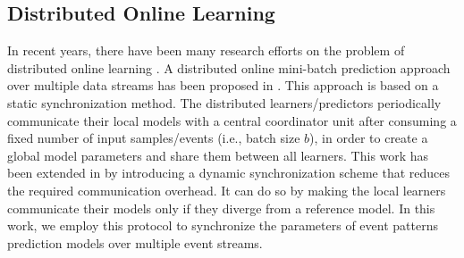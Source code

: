 
\subsection{Distributed Online Learning}
\par In recent years, there have been many research efforts on the problem of distributed online learning \cite{langford2009slow,yan2013distributed,xiao2010dual,dekel2012optimal,kamp2014communication}.  A distributed online mini-batch prediction approach over multiple data streams has been proposed in \cite{dekel2012optimal}. This approach is based on a static synchronization method. The distributed learners/predictors periodically communicate  their local models with a central coordinator unit after consuming a fixed number of input samples/events (i.e., batch size $b$), in order to  create a global model parameters and share them between all learners. This work has been extended in \cite{kamp2014communication} by introducing a
dynamic synchronization scheme that reduces the required communication overhead. It can do so by making the local learners communicate their models only if they diverge from a reference model. In this work, we employ this protocol to synchronize the parameters of event patterns prediction models  over multiple event streams. 
